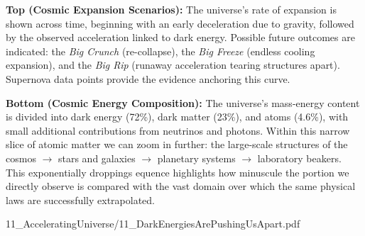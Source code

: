 \begin{SideNotePage}{
  \textbf{Top (Cosmic Expansion Scenarios):} The universe’s rate of expansion is shown across time, beginning with an early deceleration due to gravity, followed by the observed acceleration linked to dark energy. Possible future outcomes are indicated: the \emph{Big Crunch} (re-collapse), the \emph{Big Freeze} (endless cooling expansion), and the \emph{Big Rip} (runaway acceleration tearing structures apart). Supernova data points provide the evidence anchoring this curve. \par
  \textbf{Bottom (Cosmic Energy Composition):} The universe’s mass-energy content is divided into dark energy (72\%), dark matter (23\%), and atoms (4.6\%), with small additional contributions from neutrinos and photons. Within this narrow slice of atomic matter we can zoom in further: the large-scale structures of the cosmos \(\to\) stars and galaxies \(\to\) planetary systems \(\to\) laboratory beakers. This exponentially droppings equence highlights how minuscule the portion we directly observe is compared with the vast domain over which the same physical laws are successfully extrapolated. \par

}{11_AcceleratingUniverse/11_DarkEnergiesArePushingUsApart.pdf}
\end{SideNotePage}
